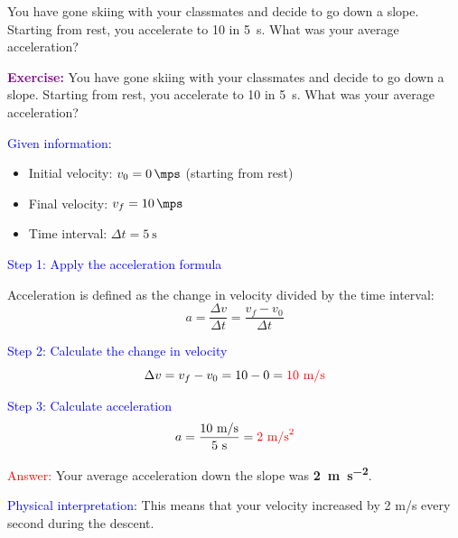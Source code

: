 \begin{exercise}
    You have gone skiing with your classmates and decide to go down a slope. Starting from rest, you accelerate to \qty{10}{\mps} in \qty{5}{\s}. What was your average acceleration?
    \begin{solu}
        \textbf{\textcolor{purple}{Exercise:}} You have gone skiing with your classmates and decide to go down a slope. Starting from rest, you accelerate to \qty{10}{\mps} in \qty{5}{\s}. What was your average acceleration?

        \vspace{0.3cm}

        \textcolor{blue}{Given information:}
        \begin{itemize}
            \item Initial velocity: $v_0 = \qty{0}{\mps}$ (starting from rest)
            \item Final velocity: $v_f = \qty{10}{\mps}$
            \item Time interval: $\Delta t = \qty{5}{\s}$
        \end{itemize}

        \textcolor{blue}{Step 1: Apply the acceleration formula}

        Acceleration is defined as the change in velocity divided by the time interval:
        \[
            \boxed{a = \frac{\Delta v}{\Delta t} = \frac{v_f - v_0}{\Delta t}}
        \]

        \textcolor{blue}{Step 2: Calculate the change in velocity}
        \[
            \Delta v = v_f - v_0 = 10 - 0 = \textcolor{red}{10 \text{ m/s}}
        \]

        \textcolor{blue}{Step 3: Calculate acceleration}
        \[
            a = \frac{10 \text{ m/s}}{5 \text{ s}} = \textcolor{red}{2 \text{ m/s}^2}
        \]

        \textcolor{red}{Answer:} Your average acceleration down the slope was \textbf{\qty{2}{\metre\per\second\squared}}.

        \textcolor{blue}{Physical interpretation:} This means that your velocity increased by 2 m/s every second during the descent.
    \end{solu}
\end{exercise}


